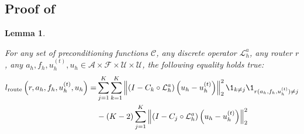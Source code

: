 \documentclass{article} %
\newtheorem{lemma}[theorem]{Lemma}
\begin{document}
\subsection{Proof of } \label{sec:proofroutingequivalence}

\begin{lemma} \label{th:routingequivalence}

For any set of preconditioning functions $\mathcal{C}$, any discrete operator $\mathcal{L}_h^a$, any router $r$, any $a_h, f_h, u_h^{(t)}, u_h \in \mathcal{A} \times \mathcal{F} \times \mathcal{U} \times \mathcal{U}$, the following equality holds true:
\begin{align*}
     l_{\text{route}}\left(r, a_h, f_h, u^{(t)}_h, u_h\right) = &\sum_{j = 1}^K \sum_{k = 1}^K\left\|\left( I - C_{k} \circ \mathcal{L}_{h}^a\right)\left(u_h - u^{(t)}_h\right)\right\|^2_2\1_{k\neq j}\1_{r(a_h, f_h, u^{(t)}_h) \neq j} \\
     &-\left(K - 2\right)\sum_{j = 1}^K\left\|\left( I - C_{j} \circ \mathcal{L}_{h}^a\right)\left(u_h - u^{(t)}_h\right)\right\|^2_2
\end{align*}
    
\end{lemma}
\end{document}
